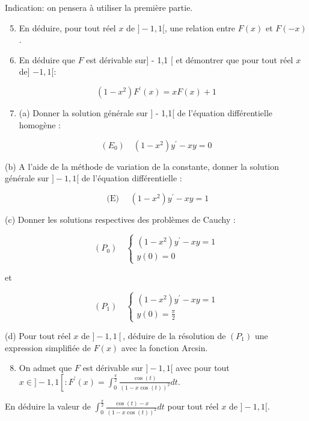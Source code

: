 \documentclass[10pt]{article}
\begin{document}
Indication: on pensera à utiliser la première partie.

\begin{enumerate}
  \setcounter{enumi}{4}
  \item En déduire, pour tout réel $x$ de $]-1,1[$, une relation entre $F(x)$ et $F(-x)$.

  \item En déduire que $F$ est dérivable sur] - 1,1 [ et démontrer que pour tout réel $x$ de] $-1,1[:$

\end{enumerate}

$$
\left(1-x^{2}\right) F^{\prime}(x)=x F(x)+1
$$

\begin{enumerate}
  \setcounter{enumi}{6}
  \item (a) Donner la solution générale sur ] - 1,1[ de l'équation différentielle homogène :
\end{enumerate}

$$
\left(E_{0}\right) \quad\left(1-x^{2}\right) y^{\prime}-x y=0
$$

(b) A l'aide de la méthode de variation de la constante, donner la solution générale sur $]-1,1[$ de l'équation différentielle :

$$
\text { (E) } \quad\left(1-x^{2}\right) y^{\prime}-x y=1
$$

(c) Donner les solutions respectives des problèmes de Cauchy :

$$
\left(P_{0}\right) \quad\left\{\begin{array}{l}
\left(1-x^{2}\right) y^{\prime}-x y=1 \\
y(0)=0
\end{array}\right.
$$

et

$$
\left(P_{1}\right) \quad\left\{\begin{array}{l}
\left(1-x^{2}\right) y^{\prime}-x y=1 \\
y(0)=\frac{\pi}{2}
\end{array}\right.
$$

(d) Pour tout réel $x$ de $]-1,1\left[\right.$, déduire de la résolution de $\left(P_{1}\right)$ une expression simplifiée de $F(x)$ avec la fonction Arcsin.

\begin{enumerate}
  \setcounter{enumi}{7}
  \item On admet que $F$ est dérivable sur $]-1,1[$ avec pour tout $x \in]-1,1\left[: F^{\prime}(x)=\int_{0}^{\frac{\pi}{2}} \frac{\cos (t)}{(1-x \cos (t))^{2}} d t\right.$.
\end{enumerate}

En déduire la valeur de $\int_{0}^{\frac{\pi}{2}} \frac{\cos (t)-x}{(1-x \cos (t))^{2}} d t$ pour tout réel $x$ de $]-1,1[$.
\end{document}
